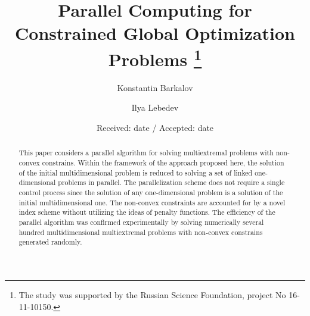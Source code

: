 \documentclass[smallextended]{svjour3}       %
\begin{document}
\title{Parallel Computing for Constrained Global Optimization Problems
\thanks{The study was supported by the Russian Science Foundation, project No 16-11-10150.}
}


\author{Konstantin Barkalov          \and
        Ilya Lebedev %
}




\date{Received: date / Accepted: date}


\maketitle

\begin{abstract}
This paper considers a parallel algorithm for solving multiextremal problems with non-convex constrains. Within the framework of the approach proposed here, the solution of the initial multidimensional problem is reduced to solving a set of linked one-dimensional problems in parallel. The parallelization scheme does not require a single control process since the solution of any one-dimensional problem is a solution of the initial multidimensional one. The non-convex constraints are accounted for by a novel index scheme without utilizing the ideas of penalty functions. The efficiency of the parallel algorithm was confirmed experimentally by solving numerically several hundred multidimensional multiextremal problems with non-convex constrains generated randomly.
\end{abstract}
\end{document}
